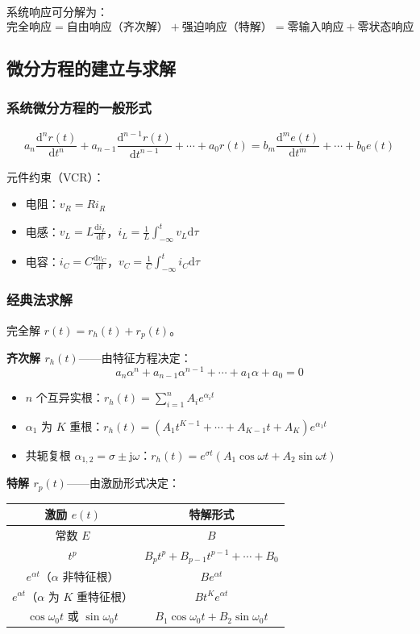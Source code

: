 \documentclass[11pt,a4paper]{ctexart}
\newcommand{\jj}{\mathrm{j}}            %
\newcommand{\dd}{\mathrm{d}}            %
\begin{document}
系统响应可分解为：
\[
\text{完全响应} = \text{自由响应（齐次解）} + \text{强迫响应（特解）}
= \text{零输入响应} + \text{零状态响应}
\]

\subsection{微分方程的建立与求解}

\subsubsection{系统微分方程的一般形式}
\[
a_n\frac{\dd^n r(t)}{\dd t^n} + a_{n-1}\frac{\dd^{n-1} r(t)}{\dd t^{n-1}} + \cdots + a_0 r(t)
= b_m\frac{\dd^m e(t)}{\dd t^m} + \cdots + b_0 e(t)
\]

元件约束（VCR）：
\begin{itemize}
    \item 电阻：$v_R = R i_R$
    \item 电感：$v_L = L\frac{\dd i_L}{\dd t}$，$i_L = \frac{1}{L}\int_{-\infty}^{t} v_L\dd\tau$
    \item 电容：$i_C = C\frac{\dd v_C}{\dd t}$，$v_C = \frac{1}{C}\int_{-\infty}^{t} i_C\dd\tau$
\end{itemize}

\subsubsection{经典法求解}

完全解 $r(t) = r_h(t) + r_p(t)$。

\textbf{齐次解 $r_h(t)$}——由特征方程决定：
\[
a_n\alpha^n + a_{n-1}\alpha^{n-1} + \cdots + a_1\alpha + a_0 = 0
\]

\begin{itemize}
    \item $n$ 个互异实根：$r_h(t) = \sum_{i=1}^{n} A_i e^{\alpha_i t}$
    \item $\alpha_1$ 为 $K$ 重根：$r_h(t) = (A_1 t^{K-1} + \cdots + A_{K-1}t + A_K)e^{\alpha_1 t}$
    \item 共轭复根 $\alpha_{1,2} = \sigma \pm \jj\omega$：$r_h(t) = e^{\sigma t}(A_1\cos\omega t + A_2\sin\omega t)$
\end{itemize}

\textbf{特解 $r_p(t)$}——由激励形式决定：

\begin{tabular}{c|c}
\toprule
激励 $e(t)$ & 特解形式 \\
\midrule
常数 $E$ & $B$ \\
$t^p$ & $B_p t^p + B_{p-1}t^{p-1} + \cdots + B_0$ \\
$e^{\alpha t}$（$\alpha$ 非特征根）& $Be^{\alpha t}$ \\
$e^{\alpha t}$（$\alpha$ 为 $K$ 重特征根）& $B t^K e^{\alpha t}$ \\
$\cos\omega_0 t$ 或 $\sin\omega_0 t$ & $B_1\cos\omega_0 t + B_2\sin\omega_0 t$ \\
\bottomrule
\end{tabular}
\end{document}
